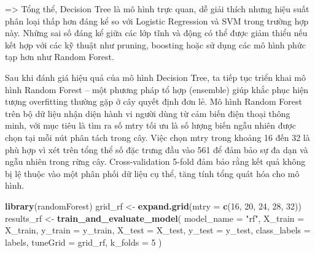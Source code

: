 \documentclass[
]{article}
\newenvironment{Shaded}{\begin{snugshade}}{\end{snugshade}}
\newcommand{\AttributeTok}[1]{\textcolor[rgb]{0.13,0.29,0.53}{#1}}
\newcommand{\DecValTok}[1]{\textcolor[rgb]{0.00,0.00,0.81}{#1}}
\newcommand{\FunctionTok}[1]{\textcolor[rgb]{0.13,0.29,0.53}{\textbf{#1}}}
\newcommand{\NormalTok}[1]{#1}
\newcommand{\OtherTok}[1]{\textcolor[rgb]{0.56,0.35,0.01}{#1}}
\newcommand{\StringTok}[1]{\textcolor[rgb]{0.31,0.60,0.02}{#1}}
\begin{document}
=\textgreater{} Tổng thể, Decision Tree là mô hình trực quan, dễ giải
thích nhưng hiệu suất phân loại thấp hơn đáng kể so với Logistic
Regression và SVM trong trường hợp này. Những sai số đáng kể giữa các
lớp tĩnh và động có thể được giảm thiểu nếu kết hợp với các kỹ thuật như
pruning, boosting hoặc sử dụng các mô hình phức tạp hơn như Random
Forest.

Sau khi đánh giá hiệu quả của mô hình Decision Tree, ta tiếp tục triển
khai mô hình Random Forest -- một phương pháp tổ hợp (ensemble) giúp
khắc phục hiện tượng overfitting thường gặp ở cây quyết định đơn lẻ. Mô
hình Random Forest trên bộ dữ liệu nhận diện hành vi người dùng từ cảm
biến điện thoại thông minh, với mục tiêu là tìm ra số mtry tối ưu là số
lượng biến ngẫu nhiên được chọn tại mỗi nút phân tách trong cây. Việc
chọn mtry trong khoảng 16 đến 32 là phù hợp vì xét trên tổng thể số đặc
trưng đầu vào 561 để đảm bảo sự đa dạn và ngẫu nhiên trong rừng cây.
Cross-validation 5-fold đảm bảo rằng kết quả không bị lệ thuộc vào một
phân phối dữ liệu cụ thể, tăng tính tổng quát hóa cho mô hình.

\begin{Shaded}
\begin{Highlighting}[]
\FunctionTok{library}\NormalTok{(randomForest)}
\NormalTok{grid\_rf }\OtherTok{\textless{}{-}} \FunctionTok{expand.grid}\NormalTok{(}\AttributeTok{mtry =} \FunctionTok{c}\NormalTok{(}\DecValTok{16}\NormalTok{, }\DecValTok{20}\NormalTok{, }\DecValTok{24}\NormalTok{, }\DecValTok{28}\NormalTok{, }\DecValTok{32}\NormalTok{))}
\NormalTok{results\_rf }\OtherTok{\textless{}{-}} \FunctionTok{train\_and\_evaluate\_model}\NormalTok{(}
  \AttributeTok{model\_name =} \StringTok{"rf"}\NormalTok{,}
  \AttributeTok{X\_train =}\NormalTok{ X\_train,}
  \AttributeTok{y\_train =}\NormalTok{ y\_train,}
  \AttributeTok{X\_test =}\NormalTok{ X\_test,}
  \AttributeTok{y\_test =}\NormalTok{ y\_test,}
  \AttributeTok{class\_labels =}\NormalTok{ labels,}
  \AttributeTok{tuneGrid =}\NormalTok{ grid\_rf,}
  \AttributeTok{k\_folds =} \DecValTok{5}
\NormalTok{)}
\end{Highlighting}
\end{Shaded}
\end{document}
